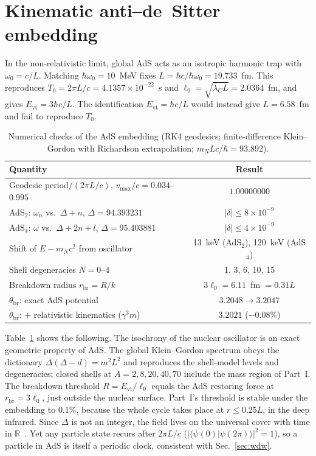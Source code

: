 \documentclass[aps,prc,twocolumn,superscriptaddress,amsmath,amssymb,nofootinbib]{revtex4-2}
\begin{document}
\section{Kinematic anti--de~Sitter embedding}
\label{sec:ads}
In the non-relativistic limit, global AdS acts as an isotropic harmonic trap with $\omega_0=c/L$. Matching $\hbar\omega_0=10$~MeV fixes $L=\hbar c/\hbar\omega_0=19.733$~fm. This reproduces $T_0=2\pi L/c=4.1357\times10^{-22}$~s and $\ell_0=\sqrt{\bar\lambda_CL}=2.0364$~fm, and gives $E_{\text{vt}}=3\hbar c/L$. The identification $E_{\text{vt}}=\hbar c/L$ would instead give $L=6.58$~fm and fail to reproduce $T_0$.

\begin{table}[t]
\caption{Numerical checks of the AdS embedding (RK4 geodesics; finite-difference Klein--Gordon with Richardson extrapolation; $m_NLc/\hbar=93.892$).}
\label{tab:ads}
\begin{ruledtabular}
\begin{tabular}{lc}
Quantity & Result \\
\hline
Geodesic period$/(2\pi L/c)$, $v_{\max}/c=0.034$--$0.995$ & $1.00000000$ \\
AdS$_2$: $\omega_n$ vs.\ $\Delta+n$, $\Delta=94.393231$ & $|\delta|\le8\times10^{-9}$ \\
AdS$_4$: $\omega$ vs.\ $\Delta+2n+l$, $\Delta=95.403881$ & $|\delta|\le4\times10^{-9}$ \\
Shift of $E-m_Nc^2$ from oscillator & 13~keV (AdS$_2$), 120~keV (AdS$_4$) \\
Shell degeneracies $N=0$--$4$ & 1, 3, 6, 10, 15 \\
Breakdown radius $r_{\text{br}}=R/k$ & $3\ell_0=6.11$~fm $=0.31L$ \\
$\dot\theta_{\text{br}}$: exact AdS potential & $3.2048\to3.2047$ \\
$\dot\theta_{\text{br}}$: + relativistic kinematics ($\gamma^3m$) & $3.2021$ ($-0.08\%$) \\
\end{tabular}
\end{ruledtabular}
\end{table}

Table~\ref{tab:ads} shows the following. The isochrony of the nuclear oscillator is an exact geometric property of AdS. The global Klein--Gordon spectrum obeys the dictionary $\Delta(\Delta-d)=m^2L^2$ and reproduces the shell-model levels and degeneracies; closed shells at $A=2,8,20,40,70$ include the mass region of Part~I. The breakdown threshold $R=E_{\text{vt}}/\ell_0$ equals the AdS restoring force at $r_{\text{br}}=3\ell_0$, just outside the nuclear surface. Part~I's threshold is stable under the embedding to $0.1\%$, because the whole cycle takes place at $r\le0.25L$, in the deep infrared. Since $\Delta$ is not an integer, the field lives on the universal cover with time in $\mathbb R$~\cite{Avis1978}. Yet any particle state recurs after $2\pi L/c$ ($|\langle\psi(0)|\psi(2\pi)\rangle|^2=1$), so a particle in AdS is itself a periodic clock, consistent with Sec.~\ref{sec:wdw}.
\end{document}
